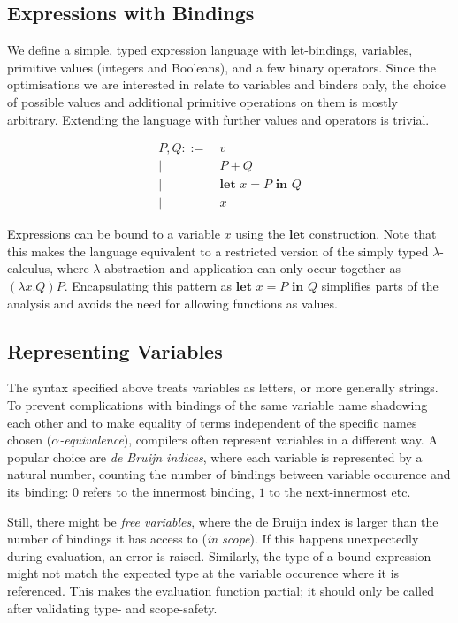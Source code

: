 \documentclass[11pt,a4paper]{article}
\begin{document}
\subsection{Expressions with Bindings}

We define a simple, typed expression language with let-bindings,
variables, primitive values (integers and Booleans), and a few binary operators.
Since the optimisations we are interested in relate to variables and binders only,
the choice of possible values and additional primitive operations on them is mostly arbitrary.
Extending the language with further values and operators is trivial.

\begin{align*}
  P, Q ::=&\ v
  \\ \big|&\ P + Q
  \\ \big|&\ \textbf{let } x = P \textbf{ in } Q
  \\ \big|&\ x
\end{align*}

Expressions can be bound to a variable $x$ using the $\textbf{let}$ construction.
Note that this makes the language equivalent to a restricted version of the simply typed $\lambda$-calculus,
where $\lambda$-abstraction and application can only occur together as $(\lambda x. Q) P$.
Encapsulating this pattern as $\textbf{let } x = P \textbf{ in } Q$
simplifies parts of the analysis and
avoids the need for allowing functions as values.


\subsection{Representing Variables}

The syntax specified above treats variables as letters, or more generally strings.
To prevent complications with bindings of the same variable name shadowing each other
and to make equality of terms independent of the specific names chosen
(\emph{$\alpha$-equivalence}),
compilers often represent variables in a different way.
A popular choice are \emph{de Bruijn indices},
where each variable is represented by a natural number,
counting the number of bindings between variable occurence and its binding:
$0$ refers to the innermost binding, $1$ to the next-innermost etc.

Still, there might be \emph{free variables},
where the de Bruijn index is larger than the number of bindings it has access to
(\emph{in scope}).
If this happens unexpectedly during evaluation, an error is raised.
Similarly, the type of a bound expression might not match the expected type at the variable occurence
where it is referenced.
This makes the evaluation function partial;
it should only be called after validating type- and scope-safety.
\end{document}

